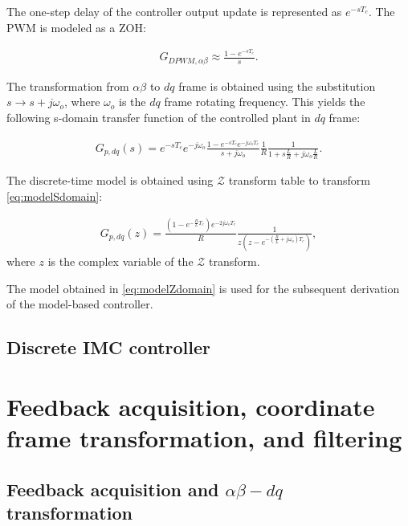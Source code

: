 \documentclass[journal]{IEEEtran}
\begin{document}
The one-step delay of the controller output update is represented as $e^{-s T_c}$. The PWM is modeled as a ZOH:

\begin{equation}
\begin{aligned}
G_{DPWM,\alpha \beta} \approx \frac{1-e^{-sT_c}}{s}.
\label{eq:DPWMAlphaBeta} 
\end{aligned}    
\end{equation}

The transformation from $\alpha \beta$ to $dq$ frame is obtained using the substitution $s \rightarrow s + j \omega_o$, where $\omega_o$ is the $dq$ frame rotating frequency.
This yields the following s-domain transfer function of the controlled plant in $dq$ frame:

\begin{equation}
\begin{aligned}
G_{p,dq}(s) = e^{-s T_c} e^{-j\omega_o} \frac{1-e^{-sT_c}e^{-j\omega_oT_c}}{s+j\omega_o} \frac{1}{R} \frac{1}{1 + s \frac{L}{R} + j\omega_o \frac{L}{R}}.
\label{eq:modelSdomain} 
\end{aligned}    
\end{equation}
 
The discrete-time model is obtained using $\mathcal{Z}$ transform table to transform \ref{eq:modelSdomain}:

\begin{equation}
\begin{aligned}
G_{p,dq}(z) = \frac{\left( 1 - e^{-\frac{R}{L}T_c}\right) e^{-2j\omega_o T_c}}{R} \frac{1}{z \left( z - e^{- \left( \frac{R}{L} + j\omega_o\right) T_c}\right)},
\label{eq:modelZdomain} 
\end{aligned}    
\end{equation}
where $z$ is the complex variable of the $\mathcal{Z}$ transform.

The model obtained in \ref{eq:modelZdomain} is used for the subsequent derivation of the model-based controller.
 
\subsection{Discrete IMC controller}


\section{Feedback acquisition, coordinate frame transformation, and filtering}

\subsection{Feedback acquisition and $\alpha \beta - dq$ transformation}
\end{document}
